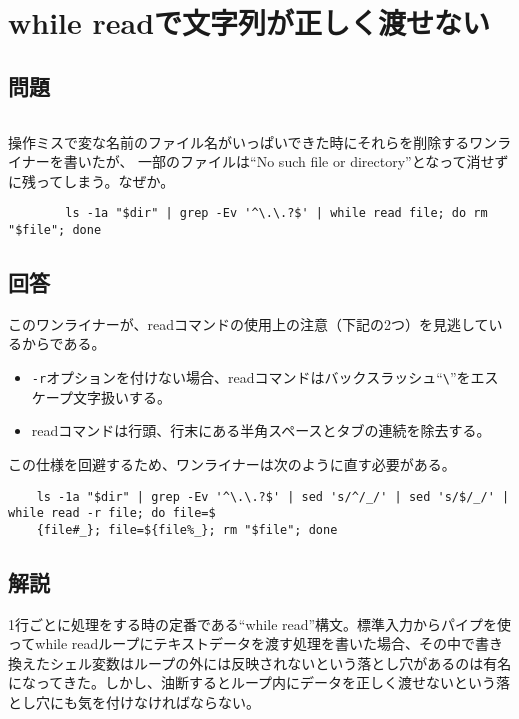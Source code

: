 \section{while readで文字列が正しく渡せない}
\label{recipe:while_read}

\subsection*{問題}
\noindent
$\!\!\!\!\!$
\begin{grshfboxit}{160.0mm}
	操作ミスで変な名前のファイル名がいっぱいできた時にそれらを削除するワンライナーを書いたが、
	一部のファイルは``No such file or directory''となって消せずに残ってしまう。なぜか。
	\begin{verbatim}
		ls -1a "$dir" | grep -Ev '^\.\.?$' | while read file; do rm "$file"; done
	\end{verbatim}
\end{grshfboxit}

\subsection*{回答}
このワンライナーが、readコマンドの使用上の注意（下記の2つ）を見逃しているからである。
\begin{itemize}
  \item \verb|-r|オプションを付けない場合、readコマンドはバックスラッシュ``\verb|\|''をエスケープ文字扱いする。
  \item readコマンドは行頭、行末にある半角スペースとタブの連続を除去する。
\end{itemize}
この仕様を回避するため、ワンライナーは次のように直す必要がある。\\
\begin{frameboxit}{160.0mm}
\begin{verbatim}
	ls -1a "$dir" | grep -Ev '^\.\.?$' | sed 's/^/_/' | sed 's/$/_/' | while read -r file; do file=$
	{file#_}; file=${file%_}; rm "$file"; done
\end{verbatim}
\end{frameboxit}

\subsection*{解説}

1行ごとに処理をする時の定番である``while read''構文。標準入力からパイプを使ってwhile readループにテキストデータを渡す処理を書いた場合、その中で書き換えたシェル変数はループの外には反映されないという落とし穴があるのは有名になってきた。しかし、油断するとループ内にデータを正しく渡せないという落とし穴にも気を付けなければならない。

